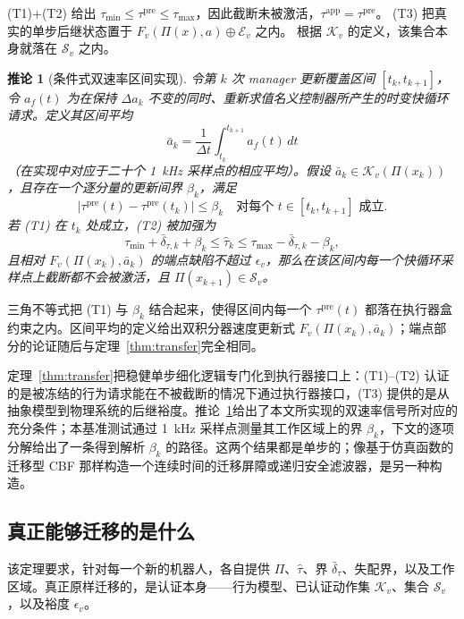 \documentclass[journal]{IEEEtran}
\newtheorem{corollary}{推论}
\begin{document}
\begin{IEEEproof}
(T1)+(T2) 给出 $\tau_{\min}\le\tau^{\mathrm{pre}}\le\tau_{\max}$，因此截断未被激活，$\tau^{\mathrm{app}}=\tau^{\mathrm{pre}}$。
(T3) 把真实的单步后继状态置于 $F_v(\Pi(x),a)\oplus\mathcal E_v$ 之内。
根据 $\mathcal K_v$ 的定义，该集合本身就落在 $\mathcal S_v$ 之内。
\end{IEEEproof}

\begin{corollary}[条件式双速率区间实现]
\label{cor:tworate}
令第 $k$ 次 manager 更新覆盖区间 $[t_k,t_{k+1}]$，令 $a_f(t)$ 为在保持 $\Delta a_k$ 不变的同时、重新求值名义控制器所产生的时变快循环请求。定义其区间平均
\[
\bar a_k=\frac{1}{\Delta t}\int_{t_k}^{t_{k+1}}a_f(t)\,dt
\]
（在实现中对应于二十个 1~kHz 采样点的相应平均）。假设 $\bar a_k\in\mathcal K_v(\Pi(x_k))$，且存在一个逐分量的更新间界 $\beta_k$，满足
\[
|\tau^{\mathrm{pre}}(t)-\tau^{\mathrm{pre}}(t_k)|\le\beta_k
\quad\text{对每个 }t\in[t_k,t_{k+1}]\text{ 成立}.
\]
若 (T1) 在 $t_k$ 处成立，(T2) 被加强为
\[
\tau_{\min}+\bar\delta_{\tau,k}+\beta_k
\le\hat\tau_k\le
\tau_{\max}-\bar\delta_{\tau,k}-\beta_k,
\]
且相对 $F_v(\Pi(x_k),\bar a_k)$ 的端点缺陷不超过 $\epsilon_v$，那么在该区间内每一个快循环采样点上截断都不会被激活，且 $\Pi(x_{k+1})\in\mathcal S_v$。
\end{corollary}

\begin{IEEEproof}
三角不等式把 (T1) 与 $\beta_k$ 结合起来，使得区间内每一个 $\tau^{\mathrm{pre}}(t)$ 都落在执行器盒约束之内。区间平均的定义给出双积分器速度更新式 $F_v(\Pi(x_k),\bar a_k)$；端点部分的论证随后与定理~\ref{thm:transfer}完全相同。
\end{IEEEproof}

定理~\ref{thm:transfer}把稳健单步细化逻辑专门化到执行器接口上：(T1)--(T2) 认证的是被冻结的行为请求能在不被截断的情况下通过执行器接口，(T3) 提供的是从抽象模型到物理系统的后继裕度。推论~\ref{cor:tworate}给出了本文所实现的双速率信号所对应的充分条件；本基准测试通过 1~kHz 采样点测量其工作区域上的界 $\beta_k$，下文的逐项分解给出了一条得到解析 $\beta_k$ 的路径。这两个结果都是单步的；像基于仿真函数的迁移型 CBF \cite{r19} 那样构造一个连续时间的迁移屏障或递归安全滤波器，是另一种构造。

\subsection{真正能够迁移的是什么}

该定理要求，针对每一个新的机器人，各自提供 $\Pi$、$\hat\tau$、界 $\bar\delta_\tau$、失配界，以及工作区域。真正原样迁移的，是认证本身——行为模型、已认证动作集 $\mathcal K_v$、集合 $\mathcal S_v$，以及裕度 $\epsilon_v$。
\end{document}
